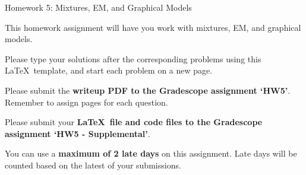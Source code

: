 \documentclass[submit]{harvardml}
\begin{document}
\begin{center}
{\Large Homework 5: Mixtures, EM, and Graphical Models}\\
\end{center}

This homework assignment will have you work with mixtures, EM, and
graphical models.  

Please type your solutions after the corresponding problems using this
\LaTeX\ template, and start each problem on a new page.

Please submit the \textbf{writeup PDF to the Gradescope assignment `HW5'}. Remember to assign pages for each question.

Please submit your \textbf{\LaTeX\ file and code files to the Gradescope assignment `HW5 - Supplemental'}. 

You can use a \textbf{maximum of 2 late days} on this assignment.  Late days will be counted based on the latest of your submissions. \\
\end{document}
